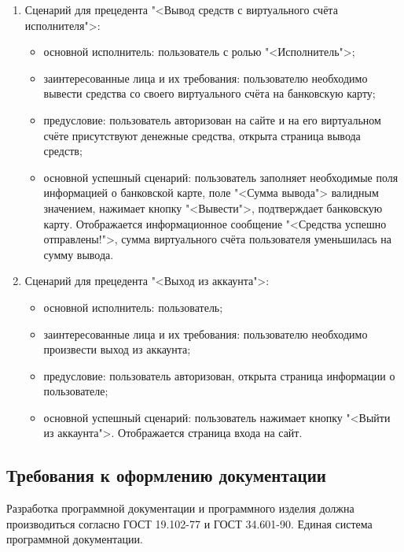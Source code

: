\begin{enumerate}
\begin{itemize}
	\end{itemize}
\item Сценарий для прецедента "<Вывод средств с виртуального счёта исполнителя">:
	\begin{itemize}
		\item основной исполнитель: пользователь с ролью "<Исполнитель">;
		\item заинтересованные лица и их требования: пользователю необходимо вывести средства со своего виртуального счёта на банковскую карту;
		\item предусловие: пользователь авторизован на сайте и на его виртуальном счёте присутствуют денежные средства, открыта страница вывода средств;
		\item основной успешный сценарий: пользователь заполняет необходимые поля информацией о банковской карте, поле "<Сумма вывода"> валидным значением, нажимает кнопку "<Вывести">, подтверждает банковскую карту. Отображается информационное сообщение "<Средства успешно отправлены!">, сумма виртуального счёта пользователя уменьшилась на сумму вывода.
	\end{itemize}
\item Сценарий для прецедента "<Выход из аккаунта">:
	\begin{itemize}
		\item основной исполнитель: пользователь;
		\item заинтересованные лица и их требования: пользователю необходимо произвести выход из аккаунта;
		\item предусловие: пользователь авторизован, открыта страница информации о пользователе;
		\item основной успешный сценарий: пользователь нажимает кнопку "<Выйти из аккаунта">. Отображается страница входа на сайт.
	\end{itemize}
\end{enumerate}

\subsection{Требования к оформлению документации}

Разработка программной документации и программного изделия должна производиться согласно ГОСТ 19.102-77 и ГОСТ 34.601-90. Единая система программной документации.
